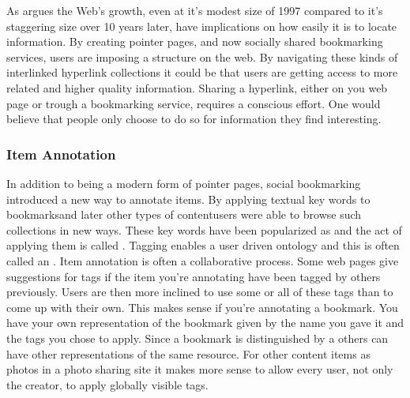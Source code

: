 


As \citet[p.~806]{dieberger97} argues the Web's growth, even at it's modest
size of 1997 compared to it's staggering size over 10 years later, have
implications on how easily it is to locate information. By creating pointer
pages, and now socially shared bookmarking services, users are imposing a
structure on the web. By navigating these kinds of interlinked hyperlink
collections it could be that users are getting access to more related and
higher quality information. Sharing a hyperlink, either on you web page or
trough a bookmarking service, requires a conscious effort. One would believe
that people only choose to do so for information they find interesting.

\subsubsection{Item Annotation}

In addition to being a modern form of pointer pages, social bookmarking
introduced a new way to annotate items. By applying textual key words to
bookmarks\dash{}and later other types of content\dash{}users were able to
browse such collections in new ways. These key words have been popularized as
 and the act of applying them is called . Tagging
enables a user driven ontology%
and this is often called an .
Item annotation is often a collaborative process. Some web pages give
suggestions for tags if the item you're annotating have been tagged by others
previously. Users are then more inclined to use some or all of these tags than
to come up with their own. This makes sense if you're annotating a bookmark.
You have your own representation of the bookmark given by the name you gave it
and the tags you chose to apply. Since a bookmark is distinguished by a
 others can have other representations of the same resource. For
other content items as photos in a photo sharing site it makes more sense to
allow every user, not only the creator, to apply globally visible tags.

